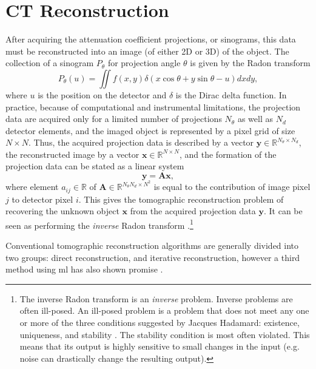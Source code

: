 \section{CT Reconstruction}
\label{sec:ct:reconstruction}
After acquiring the attenuation coefficient projections, or sinograms, this data must be reconstructed into an image (of either 2D or 3D) of the object. The collection of a sinogram $P_\theta$ for projection angle $\theta$ is given by the Radon transform \cite{4307775,jimaging4110128}
\begin{equation}
    \label{eq:radontransform}
    P_\theta(u) = \iint f\left(x,y \right)\delta\left(x \cos \theta + y \sin \theta -u \right)dxdy,
\end{equation}
where $u$ is the position on the detector and $\delta$ is the Dirac delta function. In practice, because of computational and instrumental limitations, the projection data are acquired only for a limited number of projections $N_\theta$ as well as $N_d$ detector elements, and the imaged object is represented by a pixel grid of size $N \times N$. Thus, the acquired projection data is described by a vector $\bm{y} \in \mathbb{R}^{N_\theta \times N_d}$, the reconstructed image by a vector $\bm{x} \in \mathbb{R}^{N \times N}$, and the formation of the projection data can be stated as a linear system \cite{jimaging4110128}
\begin{equation}
    \label{eq:projectiondata}
    \bm{y} = \bm{A}\bm{x},
\end{equation}
where element $a_{ij} \in \mathbb{R}$ of $\bm{A} \in \mathbb{R}^{N_\theta N_d \times N^2}$ is equal to the contribution of image pixel $j$ to detector pixel $i$. This gives the tomographic reconstruction problem of recovering the unknown object $\bm{x}$ from the acquired projection data $\bm{y}$. It can be seen as performing the \textit{inverse} Radon transform \cite{KabanikhinIllVersed,GANrec}.\footnote{The inverse Radon transform is an \textit{inverse} problem. Inverse problems are often ill-posed. An ill-posed problem is a problem that does not meet any one or more of the three conditions suggested by Jacques Hadamard: existence, uniqueness, and stability \cite{KabanikhinIllVersed}. The stability condition is most often violated. This means that its output is highly sensitive to small changes in the input (e.g. noise can drastically change the resulting output). }

Conventional tomographic reconstruction algorithms are generally divided into two groups: direct reconstruction, and iterative reconstruction, however a third method using \gls{ml} has also shown promise \cite{GANrec}.

